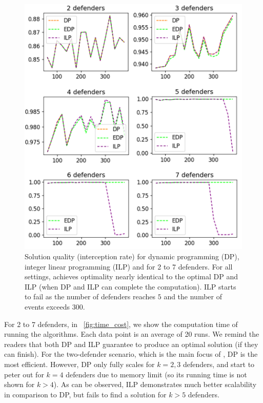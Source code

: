 \begin{figure}[h!]
    \centering
    \includegraphics[width=\linewidth]{chapters/pd/fig/quality-v.png}
    \caption{Solution quality (interception rate) for dynamic programming (DP), integer linear programming (ILP) and \ours  for 2 to 7 defenders. For all settings, \ours achieves optimality nearly identical to the optimal DP and ILP (when DP and ILP can complete the computation). ILP starts to fail as the number of defenders reaches $5$ and the number of events exceeds $300$.}
    \label{fig:quality}
\end{figure}

For 2 to 7 defenders, in ~\ref{fig:time_cost}, we show the computation time of running the algorithms. 
Each data point is an average of 20 runs. 
We remind the readers that both DP and ILP guarantee to produce an optimal solution (if they can finish).
For the two-defender scenario, which is the main focus of \cite{adler2022role}, DP is the most efficient.
However, DP only fully scales for $k=2, 3$ defenders, and start to peter out for $k=4$ defenders due to memory limit (so its running time is not shown for $k>4$).
As can be observed, ILP demonstrates much better scalability in comparison to DP, but fails to find a solution for $k > 5$ defenders. 

